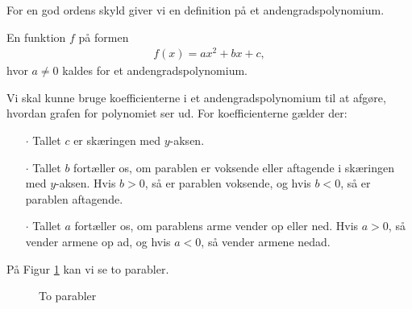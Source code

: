 For en god ordens skyld giver vi en definition på et andengradspolynomium.
\begin{defn}[Andengradspolynomium]
	En funktion $f$ på formen
	\begin{align*}
		f(x) = ax^2+bx+c,
	\end{align*}
	hvor $a \neq 0$ kaldes for et andengradspolynomium.
\end{defn}
Vi skal kunne bruge koefficienterne i et andengradspolynomium til at afgøre, hvordan grafen for polynomiet ser ud. For koefficienterne gælder der:
\begin{itemize}
	\item[$\cdot$] Tallet $c$ er skæringen med $y$-aksen.
	\item[$\cdot$] Tallet $b$ fortæller os, om parablen er voksende eller aftagende i skæringen
	med $y$-aksen. Hvis $b > 0$, så er parablen voksende, og hvis $b<0$, så er parablen 
	aftagende.
	\item[$\cdot$] Tallet $a$ fortæller os, om parablens arme vender op eller ned. Hvis 
	$a > 0$, så vender armene op ad, og hvis $a < 0$, så vender armene nedad. 
\end{itemize}
På Figur \ref{fig:andenpolys2} kan vi se to parabler. 
\begin{figure}[H]
	\centering
	\resizebox{0.45\textwidth}{!}
	{
	}
	\resizebox{0.45\textwidth}{!}
	{
	}
	\caption{To parabler}
	\label{fig:andenpolys2}
\end{figure}

